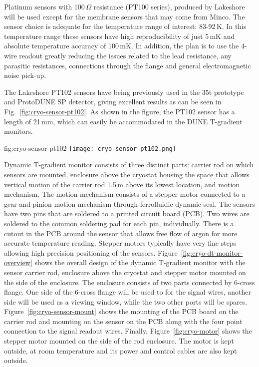Platinum sensors with 100\,$\Omega$ resistance (PT100 series), produced by Lakeshore will be used except for the membrane sensors that may come from Minco. The sensor choice is adequate for the temperature range of interest: 83-92\,K. In this temperature range these sensors have high reproducibility of just 5\,mK and absolute temperature accuracy of 100\,mK. In addition, the plan is to use the 4-wire readout greatly reducing the issues related to the lead resistance, any parasitic resistances, connections through the flange and general electromagnetic noise pick-up.

The Lakeshore PT102 sensors have being previously used in the 35t prototype and ProtoDUNE SP detector, giving excellent results as can be seen in Fig.~\ref{fig:cryo-sensor-pt102}.  As shown in the figure, the PT102 sensor has a length of 21\,mm, which can easily be accommodated in the DUNE T-gradient monitors. 

\begin{dunefigure}{fig:cryo-sensor-pt102}
\centering
  \texttt{[image: cryo-sensor-pt102.png]}
\end{dunefigure}

Dynamic T-gradient monitor consists of three distinct parts: carrier rod on which sensors are mounted, enclosure above the cryostat housing the space that allows vertical motion of the carrier rod 1.5\,m above its lowest location, and motion mechanism. The motion mechanism consists of a stepper motor connected to a gear and pinion motion mechanism through ferrofluidic dynamic seal. The sensors have two pins that are soldered to a printed circuit board (PCB). Two wires are soldered to the common soldering pad for each pin, individually.   There is a cutout in the PCB around the sensor that allows free flow of argon for more accurate temperature reading.  Stepper motors typically have very fine steps allowing high precision positioning of the sensors.  Figure~\ref{fig:cryo-dt-monitor-overview} shows the overall design of the dynamic T-gradient monitor with the sensor carrier rod, enclosure above the cryostat and stepper motor mounted on the side of the enclosure. The enclosure consists of two parts connected by 6-cross flange. One side of the 6-cross flange will be used to for the signal wires, another side will be used as a viewing window, while the two other ports will be spares. Figure~\ref{fig:cryo-sensor-mount} shows the mounting of the PCB board on the carrier rod and mounting on the sensor on the PCB along with the four point connection to the signal readout wires. Finally, Figure~\ref{fig:cryo-motor} shows the stepper motor mounted on the side of the rod enclosure. The motor is kept outside, at room temperature and its power and control cables are also kept outside.

